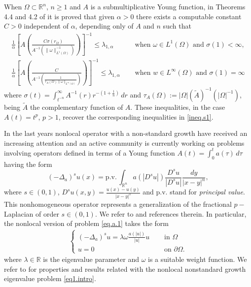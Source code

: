 \documentclass[12pt,reqno]{amsart}
\theoremstyle{definition}
\theoremstyle{remark}
\numberwithin{equation}{section}
\begin{document}
\noindent When $\Omega\subset \mathbb{R}^n$, $n\geq 1$ and $A$ is a submultiplicative Young function, in Theorems 4.4 and 4.2 of \cite{S22} it is proved that given $\alpha>0$ there exists a computable constant $C>0$ independent of $\alpha$, depending only of $A$ and $n$ such that
\begin{align*}
\frac{1}{\alpha}\left[A\left(  \frac{ C \sigma(r_\Omega)}{A^{-1}(\|\omega\|_{L^1(\Omega)}^{-1})}\right)\right]^{-1} \leq \lambda_{1,\alpha} \quad &\text{ when } \omega\in L^1(\Omega) \text{ and } \sigma(1)<\infty,\\
\frac{1}{\alpha}\left[ A\left( \frac{C}{ A^{-1}\left(\frac{1}{\tau_A(\Omega)\|\omega\|_{L^\infty(\Omega)} }\right)   }  \right) \right]^{-1}\leq \lambda_{1,\alpha} \quad &\text{ when } w\in L^\infty(\Omega) \text{ and  } \sigma(1)=\infty
\end{align*} 
where $\sigma(t)=\int_{t^{-n}}^\infty  A^{-1}(r)r^{-(1+\frac1n)}\,dr$ and $\tau_A(\Omega):=|\Omega| (\tilde A)^{-1}(|\Omega|^{-1})$, being $\tilde A$ the complementary function of $A$. These inequalities, in the case $A(t)=t^p$, $p>1$, recover the corresponding inequalities in \eqref{ineq.s1}. 

In the last years nonlocal operator with a non-standard growth have received an increasing attention and an active community is currently working on problems involving operators defined in terms of a Young function $A(t)=\int_0^t a(\tau)\,d\tau$ having the form
$$
(-\Delta_a)^s u (x) = \text{p.v.}\, \int_{\mathbb{R}^n} a(|D^s u|)\frac{D^s u}{|D^s u|}\frac{dy}{|x-y|^n},
$$
where $s\in(0,1)$,  $D^su(x,y) = \frac{u(x)-u(y)}{|x-y|^s}$ and  p.v. stand for \emph{principal value}. This nonhomogeneous operator represents a generalization of the fractional $p-$Laplacian of order $s\in (0,1)$.
We refer to \cite{ACPS2, ACPS,ACPS24, ABC, BS21, BKO23,  C2,C1,FBSp24, FBPLS,FBS19,  FBSV2, FBSV23,  S20, S22,SV22} and references therein. In particular, the nonlocal version of problem \eqref{eq.a.1} takes the form
\begin{align}\label{eq1.intro}
\begin{cases}
(-\Delta_a)^s u= \lambda \omega\frac{a(|u|)}{|u|} u &\quad \text{ in } \Omega\\
u=0& \quad \text{ on } \partial\Omega.
\end{cases}
\end{align}
where $\lambda\in \mathbb{R}$ is the eigenvalue parameter and $\omega$ is a suitable weight function.
We refer to \cite{srati,  BKO23,choi,FBSp24,  FBSV23,S20,S22, SV22} for properties and results related with the nonlocal nonstandard growth eigenvalue problem \eqref{eq1.intro}.
\end{document}
